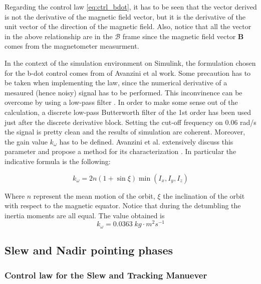 Regarding the control law \autoref{eq:ctrl_bdot}, it has to be seen that the vector derived is not the derivative of the magnetic field vector, but it is the derivative of the unit vector of the 
direction of the magnetic field. Also, notice that all the vector in the above relationship are in the $\mathcal{B}$ frame since the magnetic 
field vector $\boldsymbol{B}$ comes from the magnetometer measurment.

In the context of the simulation environment on Simulink, the formulation chosen for the b-dot control comes from \cite{bdot} of Avanzini et al work. Some precaution has to be taken
when implementing the law, since the numerical derivative of a mesaured (hence noisy) signal has to be performed. This inconvinence can be overcome by using a low-pass filter \cite{crass_book}.
In order to make some sense out of the calculation, a discrete low-pass Butterworth filter of the 1st order has been used just after the discrete derivative block. 
Setting the cut-off frequency on 0.06 rad/s the signal is pretty clean and the results of simulation are coherent.
Moreover, the gain value $k_{\omega}$ has to be defined. Avanzini et al. extensively discuss this parameter and propose a method for its characterization \cite{bdot}. In particular the indicative formula is the following:

\begin{equation}
    k_{\omega} = 2n (1 + \sin{\xi}) \min{\left( I_x, I_y, I_z \right)}
\end{equation}

Where $n$ represent the mean motion of the orbit, $\xi$ the inclination of the orbit with respect to the magnetic equator. Notice that  during the detumbling the inertia moments are all equal. The value obtained is 
\begin{equation*}
    k_{\omega} = 0.0363 \; kg\cdot m^2s^{-1}
\end{equation*}



\subsection{Slew and Nadir pointing phases}
\label{subsec:slew_subsec}

\subsubsection{Control law for the Slew and Tracking Manuever}
\label{subsubsec:slew_nadir_law}

